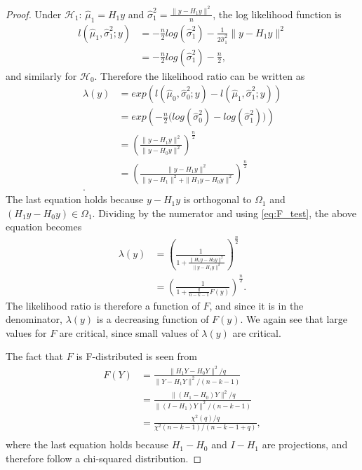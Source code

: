 \begin{proof}
    Under $\mathcal{H}_1$: $\hat{\mu}_1 = H_1 y$ and $\hat{\sigma}_1^2 = \frac{\| y - H_1 y \|^2}{n}$, the log likelihood function is
    \begin{align*}
        l(\hat{\mu}_1, \hat{\sigma}_1^2; y) &= -\frac{n}{2} log(\hat{\sigma}_1^2) - \frac{1}{2 \hat{\sigma}_1^2} \| y - H_1 y \|^2 \\
        &= -\frac{n}{2} log(\hat{\sigma}_1^2) - \frac{n}{2},
    \end{align*}
    and similarly for $\mathcal{H}_0$. Therefore the likelihood ratio can be written as
    \begin{align*}
        \lambda(y) &= exp \left( l(\hat{\mu}_0, \hat{\sigma}_0^2; y) - l(\hat{\mu}_1, \hat{\sigma}_1^2; y) \right) \\
        &= exp \left( -\frac{n}{2} \Big( log(\hat{\sigma}_0^2) - log(\hat{\sigma}_1^2)\Big) \right) \\
        &= \left( \frac{\| y - H_1 y \|^2}{\| y - H_0 y \|^2} \right)^{\frac{n}{2}} \\
        &= \left( \frac{\| y - H_1 y \|^2}{\| y - H_1 \|^2 + \| H_1 y - H_0 y \|^2} \right)^{\frac{n}{2}} \\.
    \end{align*}
    The last equation holds because $y - H_1 y$ is orthogonal to $\Omega_1$ and $(H_1 y - H_0 y) \in \Omega_1$. Dividing by the numerator and using \eqref{eq:F_test}, the above equation becomes
    \begin{align*}
        \lambda(y) &= \left( \frac{1}{1 + \frac{\| H_1 y - H_0 y \|^2}{\| y - H_1 y \|^2}} \right)^{\frac{n}{2}} \\
        &= \left( \frac{1}{1 + \frac{q}{n-k-1}F(y)}  \right)^{\frac{n}{2}}.
    \end{align*}
    The likelihood ratio is therefore a function of $F$, and since it is in the denominator, $\lambda(y)$ is a decreasing function of $F(y)$. We again see that large values for $F$ are critical, since small values of $\lambda(y)$ are critical.
    
    The fact that $F$ is F-distributed is seen from
    \begin{align*}
        F(Y) &= \frac{\| H_1 Y - H_0 Y \|^2/q}{\| Y - H_1 Y \|^2/(n-k-1)} \\
        &= \frac{\| (H_1 - H_0) Y \|^2/q}{\| (I - H_1) Y \|^2/(n-k-1)} \\
        &= \frac{\chi^2(q)/q}{\chi^2(n-k-1)/(n-k-1+q)}, \\
    \end{align*}
    where the last equation holds because $H_1 - H_0$ and $I - H_1$ are projections, and therefore follow a chi-squared distribution.
\end{proof}

